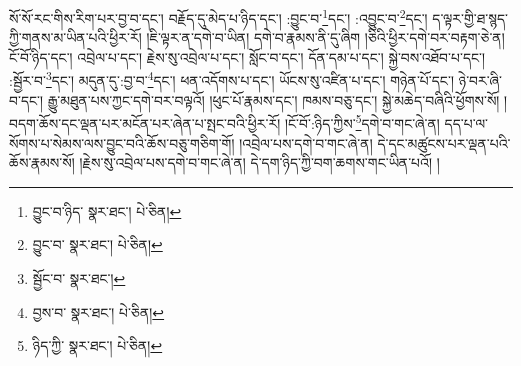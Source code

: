 སོ་སོ་རང་གིས་རིག་པར་བྱ་བ་དང་། བརྗོད་དུ་མེད་པ་ཉིད་དང་། :བྱུང་བ་\footnote{བྱུང་བ་ཉིད་  སྣར་ཐང་།  པེ་ཅིན། }དང་། :འབྱུང་བ་\footnote{བྱུང་བ་  སྣར་ཐང་།  པེ་ཅིན། }དང་། ད་ལྟར་གྱི་ཐ་སྙད་ཀྱི་གནས་མ་ཡིན་པའི་ཕྱིར་རོ། །ཇི་ལྟར་ན་དགེ་བ་ཡིན། དགེ་བ་རྣམས་ནི་དུ་ཞིག །ཅིའི་ཕྱིར་དགེ་བར་བརྟག་ཅེ་ན། ངོ་བོ་ཉིད་དང་། འབྲེལ་པ་དང་། རྗེས་སུ་འབྲེལ་པ་དང་། སློང་བ་དང་། དོན་དམ་པ་དང་། སྐྱེ་བས་འཐོབ་པ་དང་། :སྦྱོར་བ་\footnote{སྦྱོང་བ་  སྣར་ཐང་། }དང་། མདུན་དུ་:བྱ་བ་\footnote{བྱས་བ་  སྣར་ཐང་།  པེ་ཅིན། }དང་། ཕན་འདོགས་པ་དང་། ཡོངས་སུ་འཛིན་པ་དང་། གཉེན་པོ་དང་། ཉེ་བར་ཞི་བ་དང་། རྒྱུ་མཐུན་པས་ཀྱང་དགེ་བར་བལྟའོ། །ཕུང་པོ་རྣམས་དང་། ཁམས་བཅུ་དང་། སྐྱེ་མཆེད་བཞིའི་ཕྱོགས་སོ། །བདག་ཆོས་དང་ལྡན་པར་མངོན་པར་ཞེན་པ་སྤང་བའི་ཕྱིར་རོ། །ངོ་བོ་:ཉིད་ཀྱིས་\footnote{ཉིད་ཀྱི་  སྣར་ཐང་།  པེ་ཅིན། }དགེ་བ་གང་ཞེ་ན། དད་པ་ལ་སོགས་པ་སེམས་ལས་བྱུང་བའི་ཆོས་བཅུ་གཅིག་གོ། །འབྲེལ་པས་དགེ་བ་གང་ཞེ་ན། དེ་དང་མཚུངས་པར་ལྡན་པའི་ཆོས་རྣམས་སོ། །རྗེས་སུ་འབྲེལ་པས་དགེ་བ་གང་ཞེ་ན། དེ་དག་ཉིད་ཀྱི་བག་ཆགས་གང་ཡིན་པའོ། །
